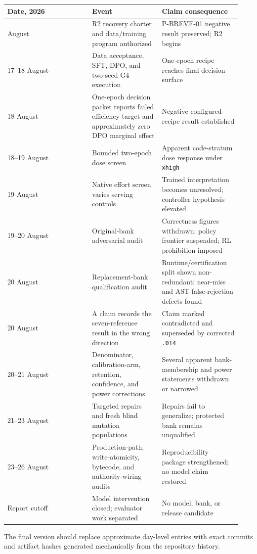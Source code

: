 \documentclass[
  9pt,
  letterpaper,
]{article}
\begin{document}
\begin{longtable}[]{@{}p{0.34\linewidth}p{0.28\linewidth}p{0.32\linewidth}@{}}
\toprule\noalign{}
Date, 2026 & Event & Claim consequence \\
\midrule\noalign{}
\endhead
\bottomrule\noalign{}
\endlastfoot
17 August & R2 recovery charter and data/training program authorized &
P-BREVE-01 negative result preserved; R2 begins \\
17--18 August & Data acceptance, SFT, DPO, and two-seed G4 execution &
One-epoch recipe reaches final decision surface \\
18 August & One-epoch decision packet reports failed efficiency target
and approximately zero DPO marginal effect & Negative configured-recipe
result established \\
18--19 August & Bounded two-epoch dose screen & Apparent code-stratum
dose response under \texttt{xhigh} \\
19 August & Native effort screen varies serving controls & Trained
interpretation becomes unresolved; controller hypothesis elevated \\
19--20 August & Original-bank adversarial audit & Correctness figures
withdrawn; policy frontier suspended; RL prohibition imposed \\
20 August & Replacement-bank qualification audit & Runtime/certification
split shown non-redundant; near-miss and AST false-rejection defects
found \\
20 August & A claim records the seven-reference result in the wrong
direction & Claim marked contradicted and superseded by corrected
\texttt{.014} \\
20--21 August & Denominator, calibration-arm, retention, confidence, and
power corrections & Several apparent bank-membership and power
statements withdrawn or narrowed \\
21--23 August & Targeted repairs and fresh blind mutation populations &
Repairs fail to generalize; protected bank remains unqualified \\
23--26 August & Production-path, write-atomicity, bytecode, and
authority-wiring audits & Reproducibility package strengthened; no model
claim restored \\
Report cutoff & Model intervention closed; evaluator work separated & No
model, bank, or release candidate \\
\end{longtable}

The final version should replace approximate day-level entries with
exact commits and artifact hashes generated mechanically from the
repository history.
\end{document}
